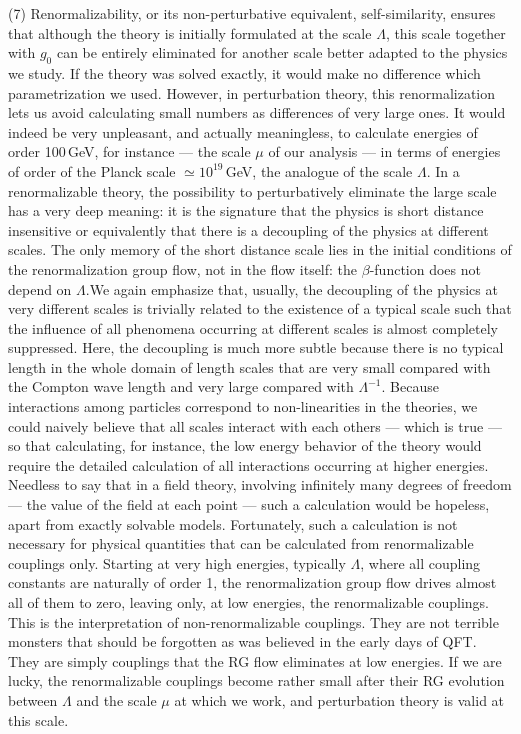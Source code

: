 \documentclass[floatfix,preprintnumbers,amsmath,amssymb,prb,12pt]{revtex4-1}
\begin{document}
{{(7) Renormalizability, or its non-perturbative equivalent,
self-similarity, ensures that although the theory is initially
formulated at the scale $\Lambda$, this scale together with $g_0$
can be entirely eliminated for another scale better adapted to the
physics we study. If the theory was solved exactly, it would make
no difference which parametrization we used.
However, in perturbation theory, this renormalization lets us
avoid calculating small numbers as differences of very large
ones. It would indeed be very unpleasant, and
actually meaningless, to calculate energies of order 100\,GeV, for
instance --- the scale
$\mu$ of our analysis --- in terms of energies of order of the 
Planck scale $\simeq 10^{19}$\,GeV, the analogue of the scale
$\Lambda$. In a renormalizable theory, the possibility to
perturbatively eliminate the large scale has a very deep
meaning: it is the signature that the physics is short
distance insensitive or equivalently that there is a 
decoupling of the physics at different scales. The only memory of
the short distance scale lies in the initial conditions of the
renormalization group flow, not in the flow itself: the
$\beta$-function does not depend on $\Lambda$.We again
emphasize that, usually, the decoupling of the physics at very
different scales is trivially related to the existence of a
typical scale such that the influence of all phenomena occurring at
different scales is almost completely suppressed. Here, the
decoupling is much more subtle because there is no typical length
in the whole domain of length scales that are very small compared
with the Compton wave length and very large compared with 
$\Lambda^{-1}$. Because interactions among particles correspond to
non-linearities in the theories, we could naively believe that all
scales interact with each others --- which is true --- so that
calculating, for instance, the low energy behavior of the theory
would require the detailed calculation of all interactions
occurring at higher energies. Needless to say that in a field
theory, involving infinitely many degrees of freedom --- the value
of the field at each point --- such a calculation would be 
hopeless, apart from exactly solvable models. Fortunately, such a calculation
is not necessary for physical quantities that can be calculated
from renormalizable couplings only. Starting at very high
energies, typically
$\Lambda$, where all coupling constants are naturally of order 1,
the renormalization group flow drives almost all of them to zero,
leaving only, at low energies, the renormalizable couplings. This
is the interpretation of non-renormalizable couplings. They are
not terrible monsters that should be forgotten as was believed in
the early days of QFT. They are simply couplings that the RG flow
eliminates at low energies. If we are lucky, the renormalizable
couplings become rather small after their RG evolution between
$\Lambda$ and the scale $\mu$ at which we work, and perturbation
theory is valid at this scale.

}}
\end{document}
